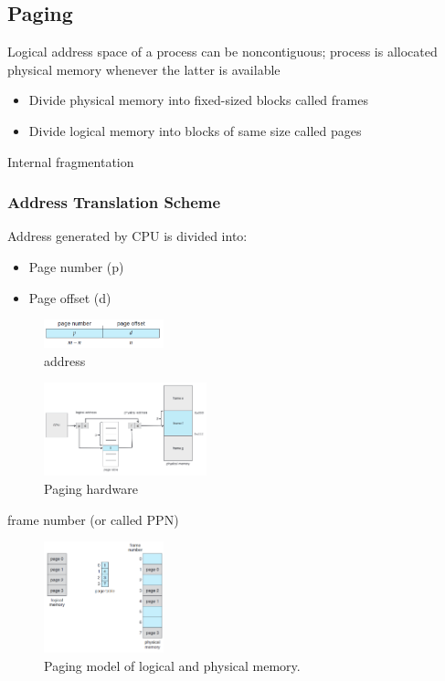 \subsection{Paging}
Logical address space of a process can be noncontiguous;
process is allocated physical memory whenever the latter is
available
\begin{itemize}\small
    \item Divide physical memory into fixed-sized blocks called frames
    \item Divide logical memory into blocks of same size called pages
\end{itemize}
Internal fragmentation


\subsubsection{Address Translation Scheme}
Address generated by CPU is divided into:
\begin{itemize}
    \item Page number (p)
    \item Page offset (d) 
\end{itemize}

\begin{figure}[!htb]
    \centering
    \includegraphics[width=0.309\textwidth]{pic/OS8/address }
    \caption{address}
\end{figure}


\begin{figure}[!htb]
    \centering
    \includegraphics[width=0.42\textwidth]{pic/OS8/Paging hardware}
    \caption{Paging hardware}
\end{figure}

frame number (or called PPN)

\begin{figure}[!htb]
    \centering
    \includegraphics[width=0.309\textwidth]{pic/OS8/Paging model of logical and physical memory.}
    \caption{Paging model of logical and physical memory.}
\end{figure}


